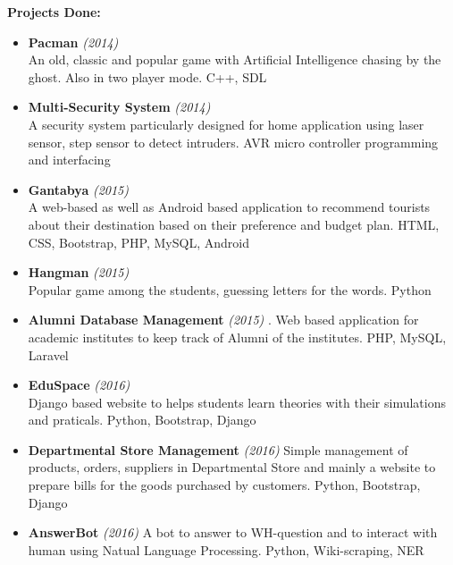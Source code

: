 \documentclass[a4paper, 12pt]{article}
\begin{document}
{\Large \textbf{Projects Done:} \\
}
\vspace{-5mm}
\begin{itemize}

	\item \textbf{Pacman } \emph{(2014)} \\
		\small An old, classic and popular game with Artificial Intelligence
		chasing by the ghost. Also in two player mode. C++, SDL
	\item \textbf{Multi-Security System} \emph{(2014)} \\
		\small A security system particularly designed for home application
		using laser sensor, step sensor to detect intruders. AVR 
		micro controller programming and interfacing
	\item \textbf{Gantabya} \emph{(2015)} \\
		\small A web-based as well as Android based application to recommend
		tourists about their destination based on their preference and budget
		plan. HTML, CSS, Bootstrap, PHP, MySQL, Android
	\item \textbf{Hangman} \emph{(2015)} \\
		\small Popular game among the students, guessing letters for the 
		words. Python
	\item \textbf{Alumni Database Management} \emph{(2015)}
		\small. Web based application for academic institutes to keep 
		track of Alumni of the institutes. PHP, MySQL, Laravel
	\item \textbf{EduSpace} \emph{(2016)} \\
		\small Django based website to helps students learn theories with
		their simulations and praticals. Python, Bootstrap, Django
	\item \textbf{Departmental Store Management} \emph{(2016)}
		\small Simple management of products, orders, suppliers in
		Departmental Store and mainly a website to prepare bills for 
		the goods purchased by customers. Python, Bootstrap, Django
	\item \textbf{AnswerBot} \emph{(2016)}
		\small A bot to answer to WH-question and to interact with human
		using Natual Language Processing. Python, Wiki-scraping, NER
\end{itemize}
\end{document}
